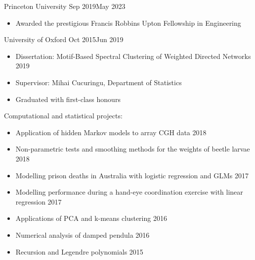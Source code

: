 \documentclass[
  date,
  number,
]{wgu-cv}
\begin{document}
\maketitle





{Princeton University}
{Sep 2019}{May 2023}

\begin{itemize}
	\item Awarded the prestigious Francis Robbins Upton Fellowship in Engineering
\end{itemize}


{University of Oxford}
{Oct 2015}{Jun 2019}

\begin{itemize}
    \item Dissertation: Motif-Based Spectral Clustering of Weighted Directed
      Networks \hfill 2019
    \item Supervisor: Mihai Cucuringu, Department of Statistics
    \item Graduated with first-class honours
\end{itemize}

Computational and statistical projects:

\begin{itemize}
	\item Application of hidden Markov models to array CGH data \hfill 2018%
	\item Non-parametric tests and smoothing methods for the weights of beetle
      larvae \hfill 2018%
	\item Modelling prison deaths in Australia with logistic regression and GLMs
      \hfill 2017%
	\item Modelling performance during a hand-eye coordination exercise with
      linear regression \hfill 2017%
	\item Applications of PCA and k-means clustering \hfill 2016%
	\item Numerical analysis of damped pendula \hfill 2016%
	\item Recursion and Legendre polynomials \hfill 2015%
\end{itemize}
\end{document}
